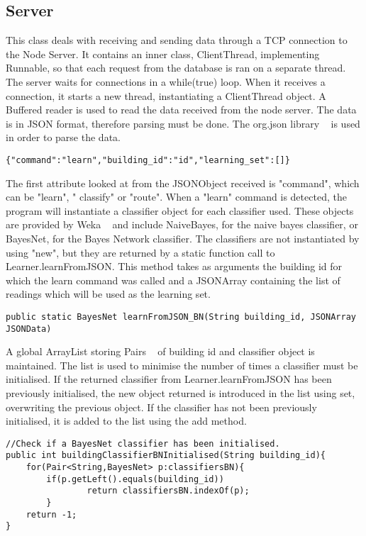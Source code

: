 \subsection{Server}
This class deals with receiving and sending data through a TCP connection to the Node Server. 
It contains an inner class, ClientThread, implementing Runnable, so that each request from the database is ran on a separate thread. The server waits for connections in a while(true) loop. When it receives a connection, it starts a new thread, instantiating a ClientThread object. A Buffered reader is used to read the data received from the node server. The data is in JSON format, therefore parsing must be done. The org.json library ~\cite{org.json} is used in order to parse the data. 
\begin{lstlisting} 
{"command":"learn","building_id":"id","learning_set":[]}
\end{lstlisting}
The first attribute looked at from the JSONObject received is "command", which can be  "learn", " classify" or "route". 
When a "learn" command is detected, the program will instantiate a classifier object for each classifier used. These objects are provided by Weka ~\cite{Weka} and include NaiveBayes, for the naive bayes classifier, or BayesNet, for the Bayes Network classifier. 
The classifiers are not instantiated by using "new", but they are returned by a static function call to Learner.learnFromJSON. This method takes as arguments the building id for which the learn command was called and a JSONArray containing the list of readings which will be used as the learning set. 
\begin{lstlisting} 
public static BayesNet learnFromJSON_BN(String building_id, JSONArray JSONData)
\end{lstlisting}
A global ArrayList storing Pairs ~\cite{tuple} of building id and classifier object is maintained. The list is used to minimise the number of times a classifier must be initialised. If the returned classifier from Learner.learnFromJSON has been previously initialised, the new object returned is introduced in the list using set, overwriting the previous object. If the classifier has not been previously initialised, it is added to the list using the add method. 
\begin{lstlisting}
//Check if a BayesNet classifier has been initialised.	
public int buildingClassifierBNInitialised(String building_id){
	for(Pair<String,BayesNet> p:classifiersBN){
		if(p.getLeft().equals(building_id))
        		return classifiersBN.indexOf(p);
        }
    return -1;
}    
\end{lstlisting}

